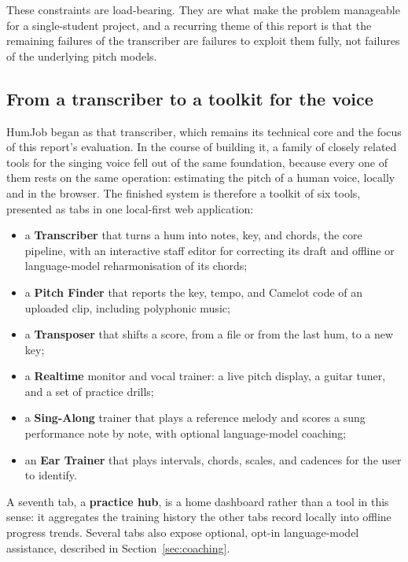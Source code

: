 \documentclass[12pt,a4paper]{article}
\begin{document}
These constraints are load-bearing. They are what make the problem manageable
for a single-student project, and a recurring theme of this report is that the
remaining failures of the transcriber are failures to exploit them fully, not
failures of the underlying pitch models.

\subsection{From a transcriber to a toolkit for the voice}
\label{sec:toolkit-intro}

HumJob began as that transcriber, which remains its technical core and the focus
of this report's evaluation. In the course of building it, a family of closely
related tools for the singing voice fell out of the same foundation, because
every one of them rests on the same operation: estimating the pitch of a human
voice, locally and in the browser. The finished system is therefore a toolkit of
six tools, presented as tabs in one local-first web application:

\begin{itemize}
    \item a \textbf{Transcriber} that turns a hum into notes, key, and chords,
    the core pipeline, with an interactive staff editor for correcting its draft
    and offline or language-model reharmonisation of its chords;
    \item a \textbf{Pitch Finder} that reports the key, tempo, and Camelot code
    of an uploaded clip, including polyphonic music;
    \item a \textbf{Transposer} that shifts a score, from a file or from the last
    hum, to a new key;
    \item a \textbf{Realtime} monitor and vocal trainer: a live pitch display, a
    guitar tuner, and a set of practice drills;
    \item a \textbf{Sing-Along} trainer that plays a reference melody and scores
    a sung performance note by note, with optional language-model coaching;
    \item an \textbf{Ear Trainer} that plays intervals, chords, scales, and
    cadences for the user to identify.
\end{itemize}

A seventh tab, a \textbf{practice hub}, is a home dashboard rather than a tool in
this sense: it aggregates the training history the other tabs record locally into
offline progress trends. Several tabs also expose optional, opt-in
language-model assistance, described in Section~\ref{sec:coaching}.
\end{document}
